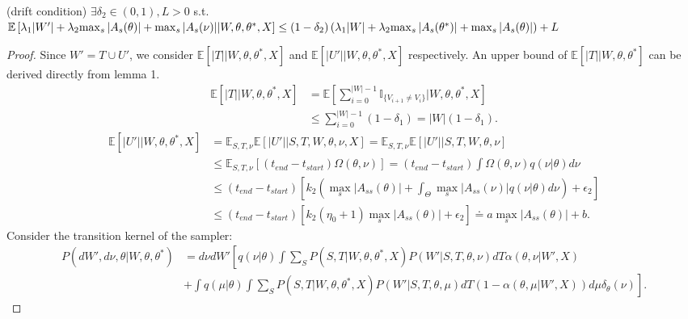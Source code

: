 \begin{lemma}(drift condition) $\exists \delta_2 \in (0, 1), L > 0$ 
  s.t. 
  $\mathbb{E}\left[\lambda_1|W'| + \lambda_2{\max_s |A_s(\theta)|}+ {\max_s |A_s(\nu)|} | W, \theta, \theta^*, X\right] 
  \leq (1 - \delta_2)\left(\lambda_1|W| + \lambda_2 {\max_s |A_s(\theta^*)|} +
  {\max_s |A_s(\theta)|} \right) + L$
\label{lem:drift}
\end{lemma}
\begin{proof}
Since $W' = T \cup U'$, we consider $\mathbb{E}[|T| | W, \theta, \theta^*, X]$ and $\mathbb{E}[|U'| | W, \theta, \theta^*, X]$ respectively.
An upper bound of $\mathbb{E}[|T| | W, \theta, \theta^*]$ can be derived directly from lemma 1.
\begin{align*}
\mathbb{E}[|T| | W, \theta, \theta^*, X] &= \mathbb{E}[\sum_{i = 0}^{|W| - 1} \mathbb{I}_{\{ V_{i + 1} \neq V_i \}}| W, \theta, \theta^*, X]\\
&\leq \sum_{i = 0}^{|W| - 1} (1 - \delta_1) = |W|(1 - \delta_1).
\end{align*}
\begin{align*}
\mathbb{E}[|U'| |W, \theta, \theta^*, X] &= \mathbb{E}_{S,T, \nu}\mathbb{E}[|U'| | S, T, W, \theta, \nu, X] = \mathbb{E}_{S,T, \nu}\mathbb{E}[|U'| | S, T, W, \theta, \nu] \\
& \leq \mathbb{E}_{S,T, \nu} \left[(t_{end} - t_{start})\Omega(\theta, \nu)\right] = (t_{end} - t_{start})\int \Omega(\theta, \nu) q(\nu | \theta) d\nu\\
& \leq (t_{end} - t_{start})\left[ k_2 \left(  \max_s|A_{ss}(\theta)| +  \int_\Theta \max_s|A_{ss}(\nu)|q(\nu | \theta)d\nu \right) + \epsilon_2 \right] \\
& \leq (t_{end} - t_{start}) \left[ k_2 (\eta_0 + 1) \max_s|A_{ss}(\theta)| + \epsilon_2 \right] \doteq a \max_s|A_{ss}(\theta)| + b.
\end{align*}
Consider the transition kernel of the sampler:
\begin{align*}
P(dW', d\nu, \theta | W, \theta, \theta^*) &
  =d\nu dW' \left[q(\nu | \theta) \int \sum_S P(S, T | W, \theta, \theta^*, X)P(W' | S, T, \theta, \nu)dT\alpha(\theta, \nu | W', X)\right. \\
                                           &\left.+ \int q(\mu | \theta) \int \sum_S P(S, T | W, \theta, \theta^*, X)P(W' | S, T, \theta, \mu)dT ( 1 - {\alpha(\theta, \mu | W', X)})d\mu \delta_\theta(\nu)\right].
\end{align*}

\end{proof}

